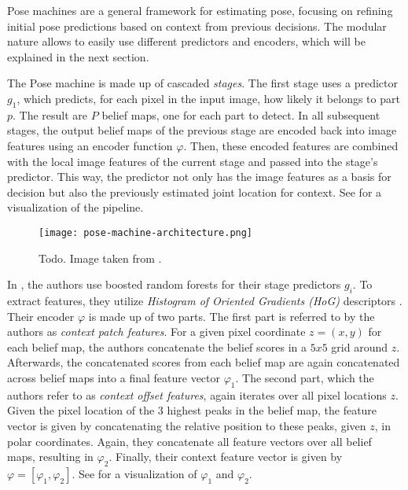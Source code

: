 Pose machines are a general framework for estimating pose, focusing on refining initial pose predictions based on context from previous decisions.
The modular nature allows to easily use different predictors and encoders, which will be explained in the next section.

The Pose machine is made up of cascaded \textit{stages}.
The first stage uses a predictor $g_1$, which predicts, for each pixel in the input image, how likely it belongs to part $p$.
The result are $P$ belief maps, one for each part to detect.
In all subsequent stages, the output belief maps of the previous stage are encoded back into image features using an encoder function $\varphi$.
Then, these encoded features are combined with the local image features of the current stage and passed into the stage's predictor.
This way, the predictor not only has the image features as a basis for decision but also the previously estimated joint location for context.
See  for a visualization of the pipeline.

\begin{figure}[htb!]
    \centering
    \texttt{[image: pose-machine-architecture.png]}
    \caption{Todo. Image taken from \cite{wei_convolutional_2016}.}
    \label{fig:pose-machines-architecture}
\end{figure}

In \cite{ramakrishna_pose_2014}, the authors use boosted random forests for their stage predictors $g_i$.
To extract features, they utilize \textit{Histogram of Oriented Gradients (HoG)} descriptors \cite{dalal_histograms_2005}.
Their encoder $\varphi$ is made up of two parts.
The first part is referred to by the authors as \textit{context patch features}.
For a given pixel coordinate $z = (x, y)$ for each belief map, the authors concatenate the belief scores in a $5 x 5$ grid around $z$.
Afterwards, the concatenated scores from each belief map are again concatenated across belief maps into a final feature vector $\varphi_1$.
The second part, which the authors refer to as \textit{context offset features}, again iterates over all pixel locations $z$.
Given the pixel location of the $3$ highest peaks in the belief map, the feature vector is given by concatenating the relative position to these peaks, given $z$, in polar coordinates.
Again, they concatenate all feature vectors over all belief maps, resulting in $\varphi_2$.
Finally, their context feature vector is given by $\varphi = [\varphi_1, \varphi_2]$.
See  for a visualization of $\varphi_1$ and $\varphi_2$.

